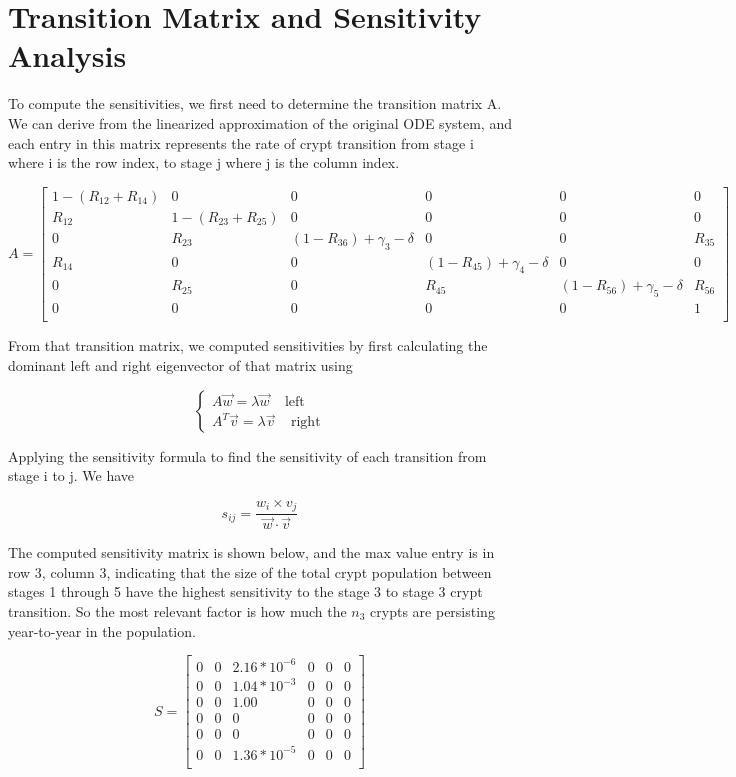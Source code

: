 \section{Transition Matrix and Sensitivity Analysis}

To compute the sensitivities, we first need to determine the transition matrix A. We can derive from the linearized approximation of the original ODE system, and each entry in this matrix represents the rate of crypt transition from stage i where i is the row index, to stage j where j is the column index.

{\small
\begin{equation}
A = \begin{bmatrix}
    1 - (R_{12} + R_{14}) & 0 & 0 & 0 & 0 & 0 \\
    R_{12} & 1-(R_{23} + R_{25}) & 0 & 0 & 0 & 0\\
    0 & R_{23} & (1-R_{36})+ \gamma_3 - \delta & 0 & 0 & R_{35}\\
    R_{14} & 0 & 0 & (1-R_{45})+ \gamma_4 - \delta & 0 & 0\\
    0 & R_{25} & 0 & R_{45} & (1-R_{56})+ \gamma_5 - \delta & R_{56}\\
    0 & 0 & 0 & 0 & 0 & 1\\
\end{bmatrix}    
\end{equation}
}

From that transition matrix, we computed sensitivities by first calculating the dominant left and right eigenvector of that matrix using

\begin{equation}
\begin{cases}
A \Vec{w} = \lambda \Vec{w}\;\;\;\;\text{left}\\
A^T\Vec{v} = \lambda \Vec{v}\;\;\;\;\text{right}
\end{cases}
\end{equation}

Applying the sensitivity formula to find the sensitivity of each transition from stage i to j. We have

\begin{equation}
s_{ij} = \frac{w_i \times v_j}{\Vec{w} \cdot \Vec{v}}
\end{equation}

The computed sensitivity matrix is shown below, and the max value entry is in row 3, column 3, indicating that the size of the total crypt population between stages 1 through 5 have the highest sensitivity to the stage 3 to stage 3 crypt transition. So the most relevant factor is how much the $n_3$ crypts are persisting year-to-year in the population.

\begin{equation}
S = \begin{bmatrix}
    0 & 0 & 2.16*10^{-6} & 0 & 0 & 0 \\
    0 & 0 & 1.04*10^{-3} & 0 & 0 & 0\\
    0 & 0 & 1.00 & 0 & 0 & 0 \\
    0 & 0 & 0 & 0 & 0 & 0 \\
    0 & 0 & 0 & 0 & 0 & 0 \\
    0 & 0 & 1.36*10^{-5} &0 & 0 & 0\\
\end{bmatrix}
\end{equation}